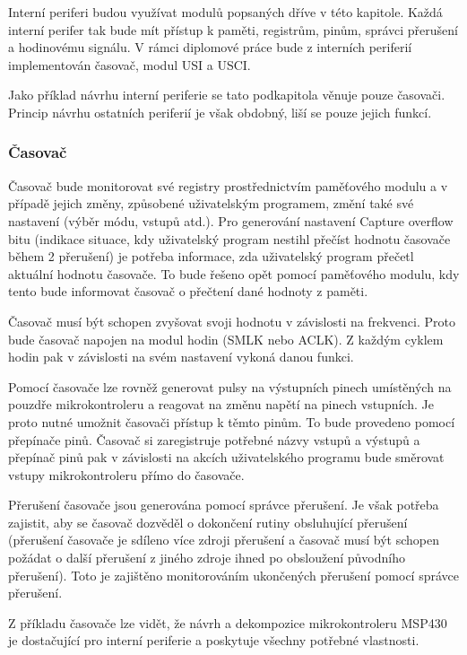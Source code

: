 Interní periferi budou využívat modulů popsaných dříve v této kapitole. Každá interní perifer tak bude mít přístup k paměti, registrům, pinům, správci
přerušení a hodinovému signálu. V rámci diplomové práce bude z interních periferií implementován časovač, modul USI a USCI.

Jako příklad návrhu interní periferie se tato podkapitola věnuje pouze časovači. Princip návrhu ostatních periferií je však obdobný, liší se pouze jejich funkcí.

\subsubsection{Časovač}

Časovač bude monitorovat své registry prostřednictvím paměťového modulu a v případě jejich změny, způsobené uživatelským programem, změní také své nastavení
(výběr módu, vstupů atd.). Pro generování nastavení Capture overflow bitu (indikace situace, kdy uživatelský program nestihl přečíst hodnotu časovače během 2 přerušení) je potřeba informace, zda uživatelský program přečetl aktuální hodnotu časovače. To bude řešeno opět pomocí paměťového modulu, kdy tento bude informovat časovač o přečtení dané hodnoty z paměti.

Časovač musí být schopen zvyšovat svoji hodnotu v závislosti na frekvenci. Proto bude časovač napojen na modul hodin (SMLK nebo ACLK). Z každým cyklem
hodin pak v závislosti na svém nastavení vykoná danou funkci.

Pomocí časovače lze rovněž generovat pulsy na výstupních pinech umístěných na pouzdře mikrokontroleru a reagovat na změnu napětí na pinech vstupních.
Je proto nutné umožnit časovači přístup k těmto pinům. To bude provedeno pomocí přepínače pinů. Časovač si zaregistruje potřebné názvy vstupů a výstupů
a přepínač pinů pak v závislosti na akcích uživatelského programu bude směrovat vstupy mikrokontroleru přímo do časovače.

Přerušení časovače jsou generována pomocí správce přerušení. Je však potřeba zajistit, aby se časovač dozvěděl o dokončení rutiny obsluhující přerušení
(přerušení časovače je sdíleno více zdroji přerušení a časovač musí být schopen požádat o další přerušení z jiného zdroje ihned po obsloužení původního přerušení). Toto je zajištěno monitorováním ukončených přerušení pomocí správce přerušení.

Z příkladu časovače lze vidět, že návrh a dekompozice mikrokontroleru MSP430 je dostačující pro interní periferie a poskytuje všechny potřebné vlastnosti.


